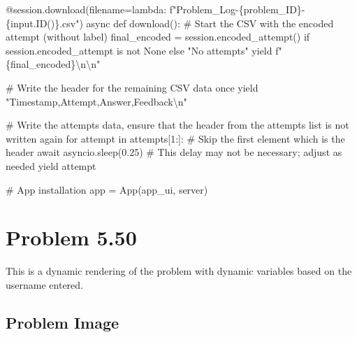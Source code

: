 \documentclass[
  letterpaper,
  DIV=11,
  numbers=noendperiod]{scrreprt}
\newenvironment{Shaded}{\begin{snugshade}}{\end{snugshade}}
\newcommand{\NormalTok}[1]{\textcolor[rgb]{0.00,0.23,0.31}{#1}}
\begin{document}
\begin{Shaded}
\begin{Highlighting}[]
\NormalTok{    @session.download(filename=lambda: f"Problem\_Log{-}\{problem\_ID\}{-}\{input.ID()\}.csv")}
\NormalTok{    async def download():}
\NormalTok{        \# Start the CSV with the encoded attempt (without label)}
\NormalTok{        final\_encoded = session.encoded\_attempt() if session.encoded\_attempt is not None else "No attempts"}
\NormalTok{        yield f"\{final\_encoded\}\textbackslash{}n\textbackslash{}n"}
        
\NormalTok{        \# Write the header for the remaining CSV data once}
\NormalTok{        yield "Timestamp,Attempt,Answer,Feedback\textbackslash{}n"}
        
\NormalTok{        \# Write the attempts data, ensure that the header from the attempts list is not written again}
\NormalTok{        for attempt in attempts[1:]:  \# Skip the first element which is the header}
\NormalTok{            await asyncio.sleep(0.25)  \# This delay may not be necessary; adjust as needed}
\NormalTok{            yield attempt}


\NormalTok{\# App installation}
\NormalTok{app = App(app\_ui, server)}
\end{Highlighting}
\end{Shaded}

\chapter*{Problem 5.50}\label{problem-5.50}


This is a dynamic rendering of the problem with dynamic variables based
on the username entered.

\section*{Problem Image}\label{problem-image-53}

\end{document}
